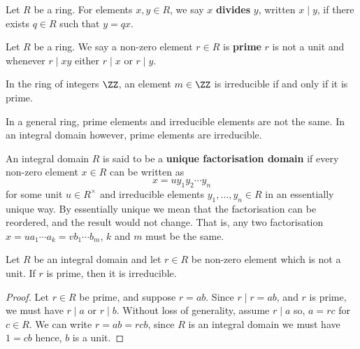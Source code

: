 \documentclass[12pt, a4paper]{article}
\begin{document}
\begin{definition}
    Let \(R\) be a ring. For elements \(x,y\in R\), we say \(x\) \textbf{divides} \(y\), written \(x\mid y\), if there exists \(q \in R\) such that \(y=qx\).
\end{definition}

\begin{definition}
    Let \(R\) be a ring. We say a non-zero element \(r \in R\) is \textbf{prime} \(r\) is not a unit and whenever \(r\mid xy\) either \(r\mid x\) or \(r\mid y\). 
\end{definition}

\begin{example}
    In the ring of integers \(\ZZ\), an element \(m \in \ZZ\) is irreducible if and only if it is prime.
\end{example}

\begin{mdexample}
    In a general ring, prime elements and irreducible elements are not the same. In an integral domain however, prime elements are irreducible.
\end{mdexample}

\begin{definition}
    An integral domain \(R\) is said to be a \textbf{unique factorisation domain} if every non-zero element \(x\in R\) can be written as 
    \[x=uy_1y_2\cdots y_n\]
    for some unit \(u \in R^{\times}\) and irreducible elements \(y_1,\ldots, y_n \in R\) in an essentially unique way.
    \noindent By essentially unique we mean that the factorisation can be reordered, and the result would not change. That is, any two factorisation \(x=ua_1\cdots a_k = vb_1 \cdots b_m\), \(k\) and \(m\) must be the same.
\end{definition}

\begin{lemma}
    Let \(R\) be an integral domain and let \(r\in R\) be non-zero element which is not a unit. If \(r\) is prime, then it is irreducible.
\end{lemma}

\begin{proof}
    Let \(r \in R\) be prime, and suppose \(r=ab\). Since \(r\mid r= ab\), and \(r\) is prime, we must have \(r\mid a\) or \(r\mid b\). Without loss of generality, assume \(r\mid a\) so, \(a=rc\) for \(c\in R\). We can write \(r=ab=rcb\), since \(R\) is an integral domain we must have \(1=cb\) hence, \(b\) is a unit.
\end{proof}
\end{document}
